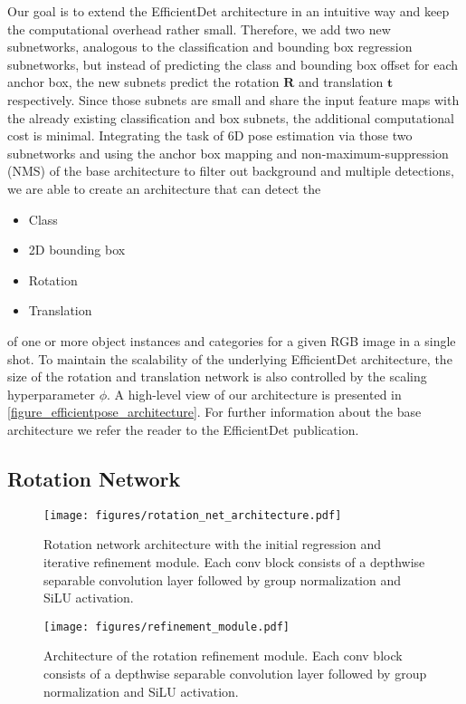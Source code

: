 \documentclass[twocolumn, 10pt, letterpaper]{article}
\begin{document}
Our goal is to extend the EfficientDet architecture in an intuitive way and keep the computational overhead rather small. Therefore, we add two new subnetworks, analogous to the classification and bounding box regression subnetworks, but instead of predicting the class and bounding box offset for each anchor box, the new subnets predict the rotation $\textbf{R}$ and translation $\textbf{t}$ respectively. Since those subnets are small and share the input feature maps with the already existing classification and box subnets, the additional computational cost is minimal. Integrating the task of 6D pose estimation via those two subnetworks and using the anchor box mapping and non-maximum-suppression (NMS) of the base architecture to filter out background and multiple detections, we are able to create an architecture that can detect the 
\begin{itemize}
	\item Class
	\item 2D bounding box
	\item Rotation
	\item Translation
\end{itemize}
of one or more object instances and categories for a given RGB image in a single shot. To maintain the scalability of the underlying EfficientDet architecture, the size of the rotation and translation network is also controlled by the scaling hyperparameter $\phi$. A high-level view of our architecture is presented in \autoref{figure_efficientpose_architecture}. For further information about the base architecture we refer the reader to the EfficientDet publication\cite{EfficientDet}.

\subsection{Rotation Network}
\label{subsection_rotation_network}

\begin{figure*}
\centering
\texttt{[image: figures/rotation\_net\_architecture.pdf]}
\caption{Rotation network architecture with the initial regression and iterative refinement module. Each conv block consists of a depthwise separable convolution layer followed by group normalization and SiLU activation.}
\label{figure_rotation_architecture}
\end{figure*}

\begin{figure}
\centering
\texttt{[image: figures/refinement\_module.pdf]}
\caption{Architecture of the rotation refinement module. Each conv block consists of a depthwise separable convolution layer followed by group normalization and SiLU activation.}
\label{figure_refinement_architecture}
\end{figure}
\end{document}
